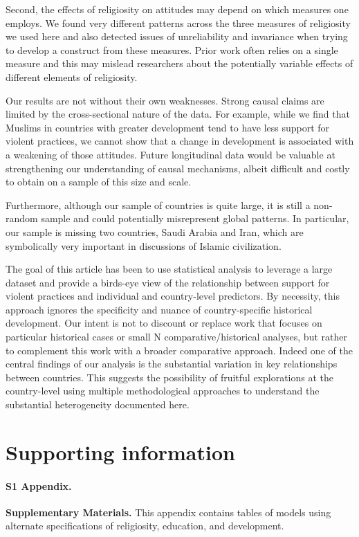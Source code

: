 \documentclass[10pt,letterpaper]{article}
\begin{document}
Second, the effects of religiosity on attitudes may depend on which measures one employs. We found very different patterns across the three measures of religiosity we used here and also detected issues of unreliability and invariance when trying to develop a construct from these measures. Prior work often relies on a single measure and this may mislead researchers about the potentially variable effects of different elements of religiosity.

Our results are not without their own weaknesses. Strong causal claims are limited by the cross-sectional nature of the data. For example, while we find that Muslims in countries with greater development tend to have less support for violent practices, we cannot show that a change in development is associated with a weakening of those attitudes. Future longitudinal data would be valuable at strengthening our understanding of causal mechanisms, albeit difficult and costly to obtain on a sample of this size and scale.

Furthermore, although our sample of countries is quite large, it is still a non-random sample and could potentially misrepresent global patterns. In particular, our sample is missing two countries, Saudi Arabia and Iran, which are symbolically very important in discussions of Islamic civilization.

The goal of this article has been to use statistical analysis to leverage a large dataset and provide a birds-eye view of the relationship between support for violent practices and individual and country-level predictors. By necessity, this approach ignores the specificity and nuance of country-specific historical development. Our intent is not to discount or replace work that focuses on particular historical cases or small N comparative/historical analyses, but rather to complement this work with a broader comparative approach. Indeed one of the central findings of our analysis is the substantial variation in key relationships between countries. This suggests the possibility of fruitful explorations at the country-level using multiple methodological approaches to understand the substantial heterogeneity documented here.

\section*{Supporting information}

\paragraph*{S1 Appendix.}
\label{S1_Appendix}
{\bf Supplementary Materials.}  This appendix contains tables of models using alternate specifications of religiosity, education, and development.
\end{document}
